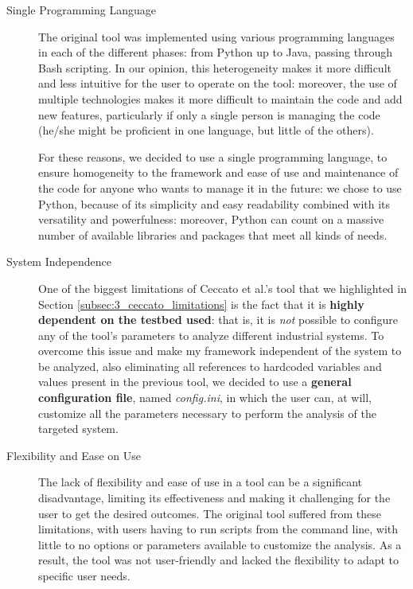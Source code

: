 \begin{description}
	\item[Single Programming Language] The original tool was implemented using various programming languages in each of the different phases: from Python up to Java, passing through Bash scripting. \newline
	In our opinion, this heterogeneity makes it more difficult and less intuitive for the user to operate on the tool: moreover, the use of multiple technologies makes it more difficult to maintain the code and add new features, particularly if only a single person is managing the code (he/she might be proficient in one language, but little of the others).
	
	\bigskip
	For these reasons, we decided to use a single programming language, to ensure homogeneity to the framework and ease of use and maintenance of the code for anyone who wants to manage it in the future: we chose to use Python, because of its simplicity and easy readability combined with its versatility and powerfulness: moreover, Python can count on a massive number of available libraries and packages that meet all kinds of needs.
	
	\item[System Independence] One of the biggest limitations of Ceccato et al.'s tool that we highlighted in Section \ref{subsec:3_ceccato_limitations} is the fact that it is \textbf{highly dependent on the testbed used}: that is, it is \textit{not} possible to configure any of the tool's parameters to analyze different industrial systems.\newline
	To overcome this issue and make my framework independent of the system to be analyzed, also eliminating all references to hardcoded variables and values present in the previous tool, we decided to use a \textbf{general configuration file}, named \textit{config.ini}, in which the user can, at will, customize all the parameters necessary to perform the analysis of the targeted system.
	
	\item[Flexibility and Ease on Use] The lack of flexibility and ease of use in a tool can be a significant disadvantage, limiting its effectiveness and making it challenging for the user to get the desired outcomes. The original tool suffered from these limitations, with users having to run scripts from the command line, with little to no options or parameters available to customize the analysis. As a result, the tool was not user-friendly and lacked the flexibility to adapt to specific user needs. 
	

\end{description}

